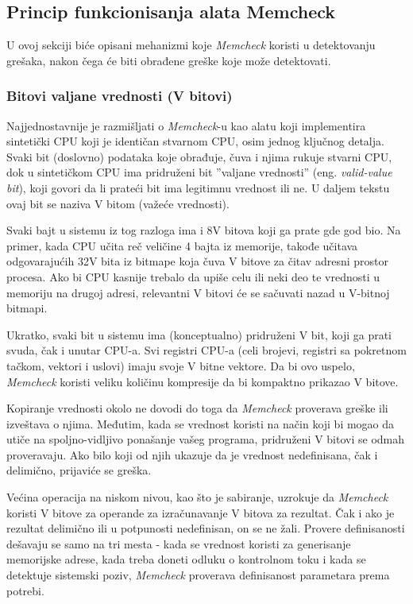\documentclass[12pt,oneside]{memoir}
\theoremstyle{plain}
\theoremstyle{definition}
\begin{document}
\subsection{Princip funkcionisanja alata Memcheck}

U ovoj sekciji biće opisani mehanizmi koje \textit{Memcheck} koristi u detektovanju grešaka, nakon čega će biti obrađene greške koje može detektovati.

\subsubsection{Bitovi valjane vrednosti (V bitovi)}
Najjednostavnije je razmišljati o \textit{Memcheck}-u kao alatu koji implementira sintetički CPU koji je identičan stvarnom CPU, osim jednog ključnog detalja. Svaki bit (doslovno) podataka koje obrađuje, čuva i njima rukuje stvarni CPU, dok u sintetičkom CPU ima pridruženi bit ''valjane vrednosti'' (eng. \textit{valid-value bit}), koji govori da li prateći bit ima legitimnu vrednost ili ne. U daljem tekstu ovaj bit se naziva V bitom (važeće vrednosti).

Svaki bajt u sistemu iz tog razloga ima i 8V bitova koji ga prate gde god bio. Na primer, kada CPU učita reč veličine 4 bajta iz memorije, takođe učitava odgovarajućih 32V bita iz bitmape koja čuva V bitove za čitav adresni prostor procesa. Ako bi CPU kasnije trebalo da upiše celu ili neki deo te vrednosti u memoriju na drugoj adresi, relevantni V bitovi će se sačuvati nazad u V-bitnoj bitmapi.

Ukratko, svaki bit u sistemu ima (konceptualno) pridruženi V bit, koji ga prati svuda, čak i unutar CPU-a. Svi registri CPU-a (celi brojevi, registri sa pokretnom tačkom, vektori i uslovi) imaju svoje V bitne vektore. Da bi ovo uspelo, \textit{Memcheck} koristi veliku količinu kompresije da bi kompaktno prikazao V bitove.

Kopiranje vrednosti okolo ne dovodi do toga da \textit{Memcheck} proverava greške ili izveštava o njima. Međutim, kada se vrednost koristi na način koji bi mogao da utiče na spoljno-vidljivo ponašanje vašeg programa, pridruženi V bitovi se odmah proveravaju. Ako bilo koji od njih ukazuje da je vrednost nedefinisana, čak i delimično, prijaviće se greška.

Većina operacija na niskom nivou, kao što je sabiranje, uzrokuje da \textit{Memcheck} koristi V bitove za operande za izračunavanje V bitova za rezultat. Čak i ako je rezultat delimično ili u potpunosti nedefinisan, on se ne žali. Provere definisanosti dešavaju se samo na tri mesta -  kada se vrednost koristi za generisanje memorijske adrese, kada treba doneti odluku o kontrolnom toku i kada se detektuje sistemski poziv, \textit{Memcheck} proverava definisanost parametara prema potrebi.
\end{document}
